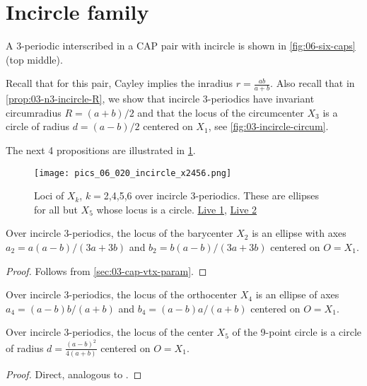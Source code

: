 \section{Incircle family}

A 3-periodic interscribed in a CAP pair with incircle is shown in \cref{fig:06-six-caps}(top middle).

Recall that for this pair, Cayley implies the inradius $r=\frac{{a}{b}}{a+b}$. Also recall that in \cref{prop:03-n3-incircle-R}, we show that incircle 3-periodics have invariant circumradius $R=(a+b)/2$ and that the locus of the circumcenter $X_3$ is a circle of radius $d=(a-b)/2$ centered on $X_1$, see \cref{fig:03-incircle-circum}.

The next 4 propositions are illustrated in \cref{fig:06-incircle-x2456}.

\begin{figure}
    \centering
    \texttt{[image: pics\_06\_020\_incircle\_x2456.png]}
    \caption{Loci of $X_k$, $k=$2,4,5,6 over incircle 3-periodics. These are ellipses for all but $X_5$ whose locus is a circle. \href{https://bit.ly/2SvuMpi}{Live 1}, \href{https://bit.ly/3fpO098}{Live 2}}
    \label{fig:06-incircle-x2456}
\end{figure}

\begin{proposition}
Over incircle 3-periodics, the locus of the barycenter $X_2$ is an ellipse with axes $a_2=a(a - b)/(3a + 3b)$ and $b_2=b(a - b)/(3a + 3b)$ centered on $O=X_1$.
 \label{prop:06-incircle-X2-locus}
\end{proposition}

\begin{proof}
Follows from \cref{sec:03-cap-vtx-param}.
\end{proof}

\begin{proposition}
Over incircle 3-periodics, the locus of the orthocenter $X_4$ is an ellipse of axes $a_4=(a - b)b/(a + b) $ and $b_4=(a - b)a/(a + b)$
 centered  on $O=X_1$.
\label{prop:06-x4-locus}
\end{proposition}

\begin{proposition}
Over incircle 3-periodics, the locus of the center $X_5$ of the 9-point circle is a circle of radius $d=\frac{(a-b)^2}{4(a+b)}$
  centered on $O=X_1$.
\label{prop:X5}
\end{proposition}

\begin{proof}
Direct, analogous to \cite[Thm.3]{garcia2020-new-properties}.
\end{proof}

